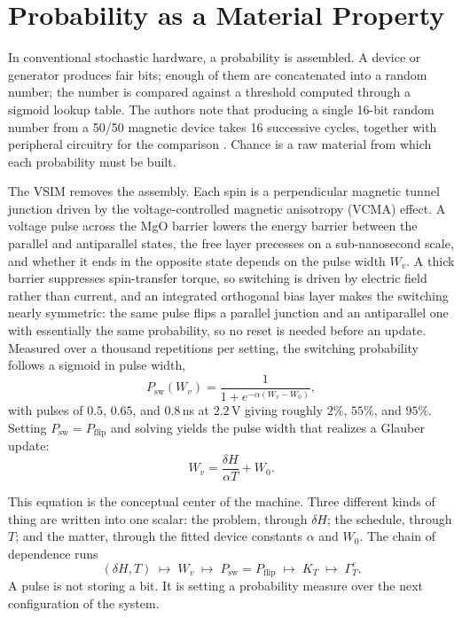 \documentclass[11pt]{article}
\theoremstyle{definition}
\theoremstyle{remark}
\begin{document}
\section{Probability as a Material Property}

In conventional stochastic hardware, a probability is assembled. A device or generator produces fair bits; enough of them are concatenated into a random number; the number is compared against a threshold computed through a sigmoid lookup table. The authors note that producing a single 16-bit random number from a 50/50 magnetic device takes 16 successive cycles, together with peripheral circuitry for the comparison \cite{li2026}. Chance is a raw material from which each probability must be built.

The VSIM removes the assembly. Each spin is a perpendicular magnetic tunnel junction driven by the voltage-controlled magnetic anisotropy (VCMA) effect. A voltage pulse across the MgO barrier lowers the energy barrier between the parallel and antiparallel states, the free layer precesses on a sub-nanosecond scale, and whether it ends in the opposite state depends on the pulse width $W_v$. A thick barrier suppresses spin-transfer torque, so switching is driven by electric field rather than current, and an integrated orthogonal bias layer makes the switching nearly symmetric: the same pulse flips a parallel junction and an antiparallel one with essentially the same probability, so no reset is needed before an update. Measured over a thousand repetitions per setting, the switching probability follows a sigmoid in pulse width,
\begin{equation}
P_{\mathrm{sw}}(W_v) = \frac{1}{1 + e^{-\alpha (W_v - W_0)}},
\end{equation}
with pulses of $0.5$, $0.65$, and $0.8$\,ns at $2.2$\,V giving roughly $2\%$, $55\%$, and $95\%$. Setting $P_{\mathrm{sw}} = P_{\mathrm{flip}}$ and solving yields the pulse width that realizes a Glauber update:
\begin{equation}
W_v = \frac{\delta H}{\alpha T} + W_0 .
\end{equation}

This equation is the conceptual center of the machine. Three different kinds of thing are written into one scalar: the problem, through $\delta H$; the schedule, through $T$; and the matter, through the fitted device constants $\alpha$ and $W_0$. The chain of dependence runs
\begin{equation}
(\delta H, T) \;\longmapsto\; W_v \;\longmapsto\; P_{\mathrm{sw}} = P_{\mathrm{flip}} \;\longmapsto\; K_T \;\longmapsto\; \Gamma_T^{\varepsilon}.
\end{equation}
A pulse is not storing a bit. It is setting a probability measure over the next configuration of the system.
\end{document}
